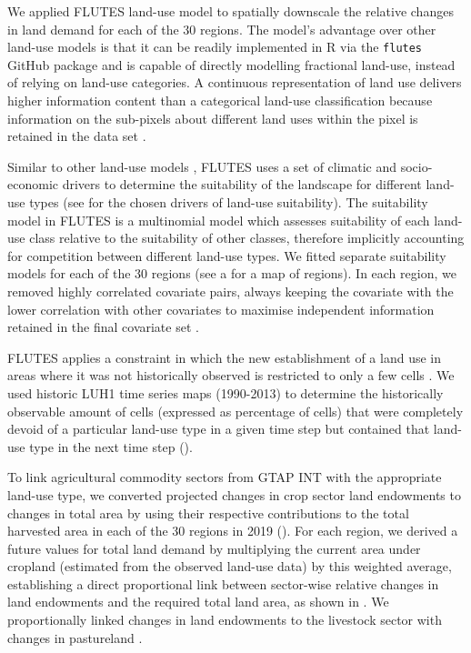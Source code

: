 \documentclass[titlesmallcaps,copyrightpage]{uomthesis}\usepackage[]{graphicx}\usepackage[]{color}
\begin{document}
We applied FLUTES land-use model to spatially downscale the relative changes in land demand for each of the 30 regions. The model's advantage over other land-use models is that it can be readily implemented in R via the \texttt{flutes} GitHub package and is capable of directly modelling fractional land-use, instead of relying on land-use categories. A continuous representation of land use delivers higher information content than a categorical land-use classification because information on the sub-pixels about different land uses within the pixel is retained in the data set \citep{seo_mapping_2016}.

Similar to other land-use models \citep[i.e.][]{fuchs_high-resolution_2013, veldkamp_clue_1996}, FLUTES uses a set of climatic and socio-economic drivers to determine the suitability of the landscape for different land-use types (see  for the chosen drivers of land-use suitability). The suitability model in FLUTES is a multinomial model which assesses suitability of each land-use class relative to the suitability of other classes, therefore implicitly accounting for competition between different land-use types. We fitted separate suitability models for each of the 30 regions (see a for a map of regions). In each region, we removed highly correlated covariate pairs, always keeping the covariate with the lower correlation with other covariates to maximise independent information retained in the final covariate set \citep{kapitza_assessing_2021}.

FLUTES applies a constraint in which the new establishment of a land use in areas where it was not historically observed is restricted to only a few cells \citep{kapitza_predictive_2020}. We used historic LUH1 time series maps (1990-2013) to determine the historically observable amount of cells (expressed as percentage of cells) that were completely devoid of a particular land-use type in a given time step but contained that land-use type in the next time step ().

To link agricultural commodity sectors from GTAP INT with the appropriate land-use type, we converted projected changes in crop sector land endowments to changes in total area by using their respective contributions to the total harvested area in each of the 30 regions in 2019 (). For each region, we derived a future values for total land demand by multiplying the current area under cropland (estimated from the observed land-use data) \citep{hoskins_downscaling_2016} by this weighted average, establishing a direct proportional link between sector-wise relative changes in land endowments and the required total land area, as shown in \citet{kapitza_assessing_2021}. We proportionally linked changes in land endowments to the livestock sector with changes in pastureland \citep{kapitza_assessing_2021}.
\end{document}

